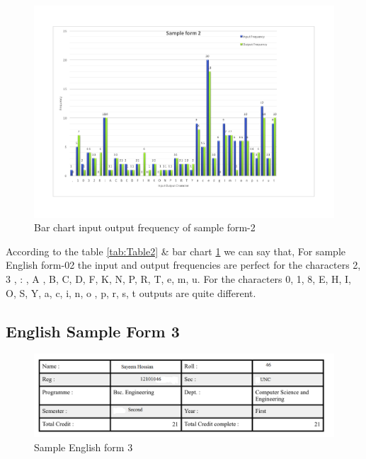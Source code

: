 \begin{figure}[H]
\centering
\includegraphics[width=1\textwidth]{form2.pdf}
\caption {Bar chart input output frequency of sample form-2}
\label {fig:bar2}
\end{figure}
According to the table \ref{tab:Table2} \& bar chart \ref{fig:bar2} we can say that, For sample English form-02 the input and output frequencies are perfect for the characters 2, 3 , :  , A , B, C, D, F, K, N, P, R, T, e, m, u. For the characters 0, 1, 8, E, H, I, O, S, Y, a, c, i, n, o , p, r, s, t outputs are quite different. 
\subsection{English Sample Form 3}

\begin{figure}[H]
\centering
\includegraphics[width=1\textwidth]{form3.png}
\caption {Sample English form 3}
\label {fig:form3}
\end{figure}

